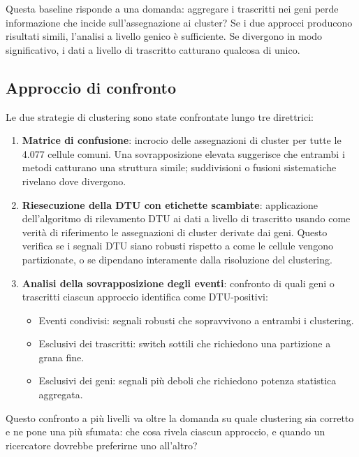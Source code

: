 Questa baseline risponde a una domanda: aggregare i trascritti nei geni perde informazione che incide sull'assegnazione ai cluster? Se i due approcci producono risultati simili, l'analisi a livello genico è sufficiente. Se divergono in modo significativo, i dati a livello di trascritto catturano qualcosa di unico.

\subsection*{Approccio di confronto}

Le due strategie di clustering sono state confrontate lungo tre direttrici:

\begin{enumerate}
    \item \textbf{Matrice di confusione}: incrocio delle assegnazioni di cluster per tutte le 4.077 cellule comuni. Una sovrapposizione elevata suggerisce che entrambi i metodi catturano una struttura simile; suddivisioni o fusioni sistematiche rivelano dove divergono.
    \item \textbf{Riesecuzione della DTU con etichette scambiate}: applicazione dell'algoritmo di rilevamento DTU ai dati a livello di trascritto usando come verità di riferimento le assegnazioni di cluster derivate dai geni. Questo verifica se i segnali DTU siano robusti rispetto a come le cellule vengono partizionate, o se dipendano interamente dalla risoluzione del clustering.
    \item \textbf{Analisi della sovrapposizione degli eventi}: confronto di quali geni o trascritti ciascun approccio identifica come DTU-positivi:
    \begin{itemize}
        \item Eventi condivisi: segnali robusti che sopravvivono a entrambi i clustering.
        \item Esclusivi dei trascritti: switch sottili che richiedono una partizione a grana fine.
        \item Esclusivi dei geni: segnali più deboli che richiedono potenza statistica aggregata.
    \end{itemize}
\end{enumerate}

Questo confronto a più livelli va oltre la domanda su quale clustering sia corretto e ne pone una più sfumata: che cosa rivela ciascun approccio, e quando un ricercatore dovrebbe preferirne uno all'altro?

